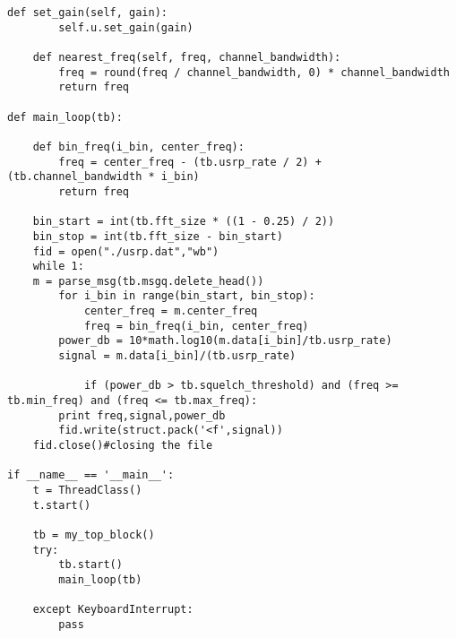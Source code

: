 \begin{lstlisting}[breaklines]
    def set_gain(self, gain):
        self.u.set_gain(gain)

    def nearest_freq(self, freq, channel_bandwidth):
        freq = round(freq / channel_bandwidth, 0) * channel_bandwidth
        return freq

def main_loop(tb):

    def bin_freq(i_bin, center_freq):
        freq = center_freq - (tb.usrp_rate / 2) + (tb.channel_bandwidth * i_bin)
        return freq

    bin_start = int(tb.fft_size * ((1 - 0.25) / 2))
    bin_stop = int(tb.fft_size - bin_start)
    fid = open("./usrp.dat","wb")
    while 1:
	m = parse_msg(tb.msgq.delete_head())
        for i_bin in range(bin_start, bin_stop):
            center_freq = m.center_freq
            freq = bin_freq(i_bin, center_freq)
	    power_db = 10*math.log10(m.data[i_bin]/tb.usrp_rate)
	    signal = m.data[i_bin]/(tb.usrp_rate)

            if (power_db > tb.squelch_threshold) and (freq >= tb.min_freq) and (freq <= tb.max_freq):
		print freq,signal,power_db
		fid.write(struct.pack('<f',signal))
    fid.close()#closing the file

if __name__ == '__main__':
    t = ThreadClass()
    t.start()

    tb = my_top_block()
    try:
        tb.start()
        main_loop(tb)

    except KeyboardInterrupt:
        pass
\end{lstlisting}

